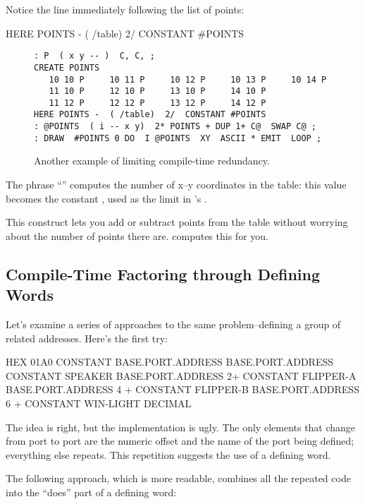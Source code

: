 Notice the line immediately following the list of points:

\begin{Code}
HERE POINTS -  ( /table)  2/  CONSTANT #POINTS
\end{Code}
\begin{figure*}[bbbb]
\caption{Another example of limiting compile-time redundancy.}
\begin{center}
\begin{BVerbatim}
: P  ( x y -- )  C, C, ;
CREATE POINTS
   10 10 P     10 11 P     10 12 P     10 13 P     10 14 P
   11 10 P     12 10 P     13 10 P     14 10 P
   11 12 P     12 12 P     13 12 P     14 12 P
HERE POINTS -  ( /table)  2/  CONSTANT #POINTS
: @POINTS  ( i -- x y)  2* POINTS + DUP 1+ C@  SWAP C@ ;
: DRAW  #POINTS 0 DO  I @POINTS  XY  ASCII * EMIT  LOOP ;
\end{BVerbatim}
\end{center}
\end{figure*}
The phrase ``'' computes the number of x--y
coordinates in the table: this value becomes the constant
, used as the limit in 's .

This construct lets you add or subtract points from the table without
worrying about the number of points there are. \Forth{} computes this
for you.

\subsection{{Compile-Time Factoring through Defining Words}}%
%
Let's examine a series of approaches to the same problem--defining a
group of related addresses. Here's the first try:

\begin{Code}
HEX 01A0 CONSTANT BASE.PORT.ADDRESS
BASE.PORT.ADDRESS CONSTANT SPEAKER
BASE.PORT.ADDRESS 2+ CONSTANT FLIPPER-A
BASE.PORT.ADDRESS 4 + CONSTANT FLIPPER-B
BASE.PORT.ADDRESS 6 + CONSTANT WIN-LIGHT
DECIMAL
\end{Code}
The idea is right, but the implementation is ugly. The only elements
that change from port to port are the numeric offset and the name of
the port being defined; everything else repeats. This repetition
suggests the use of a defining word.

The following approach, which is more readable, combines all the
repeated code into the ``does'' part  of a defining word:


